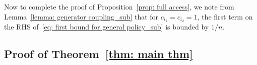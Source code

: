 \documentclass[a4paper]{article}
\theoremstyle{plain}
\theoremstyle{definition}
\theoremstyle{case}
\theoremstyle{remark}
\begin{document}
Now to complete the proof of Proposition~\ref{prop: full access}, we note from Lemma~\ref{lemma: generator coupling_sub} that for $c_{i_1}=c_{i_2}=1$, the first term on the RHS of~\eqref{eq: first bound for general policy_sub} is bounded by $1/n$.





\subsection{Proof of Theorem~\ref{thm: main thm}} 
\end{document}
